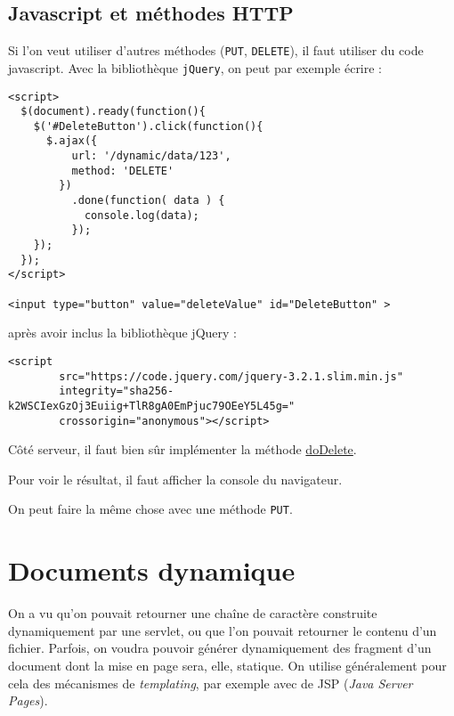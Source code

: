 \documentclass[11pt]{article}
\begin{document}
\subsection{Javascript et méthodes HTTP}
\label{sec:orgee56324}
Si l'on veut utiliser d'autres méthodes (\texttt{PUT}, \texttt{DELETE}), il faut utiliser du code javascript.
Avec la bibliothèque \texttt{jQuery}, on peut par exemple écrire :
\begin{verbatim}
<script>
  $(document).ready(function(){
    $('#DeleteButton').click(function(){
      $.ajax({
          url: '/dynamic/data/123',
          method: 'DELETE'
        })
          .done(function( data ) {
            console.log(data);
          });
    });
  });
</script>

<input type="button" value="deleteValue" id="DeleteButton" >
\end{verbatim}

après avoir inclus la bibliothèque jQuery :
\begin{verbatim}
<script
        src="https://code.jquery.com/jquery-3.2.1.slim.min.js"
        integrity="sha256-k2WSCIexGzOj3Euiig+TlR8gA0EmPjuc79OEeY5L45g="
        crossorigin="anonymous"></script>
\end{verbatim}

Côté serveur, il faut bien sûr implémenter la méthode \href{https://tomcat.apache.org/tomcat-5.5-doc/servletapi/javax/servlet/http/HttpServlet.html#doDelete(javax.servlet.http.HttpServletRequest,\%2520javax.servlet.http.HttpServletResponse)}{doDelete}.

Pour voir le résultat, il faut afficher la console du navigateur.

On peut faire la même chose avec une méthode \texttt{PUT}.

\section{Documents dynamique}
\label{sec:org0f83d32}

On a vu qu'on pouvait retourner une chaîne de caractère construite dynamiquement
par une servlet, ou que l'on pouvait retourner le contenu d'un fichier. Parfois,
on voudra pouvoir générer dynamiquement des fragment d'un document dont la mise
en page sera, elle, statique. On utilise généralement pour cela des mécanismes
de \emph{templating}, par exemple avec de JSP (\emph{Java Server Pages}).
\end{document}

